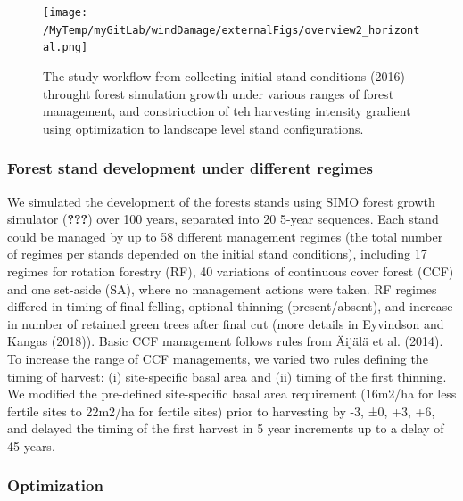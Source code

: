 \documentclass[]{elsarticle} %
\begin{document}
\begin{figure}
\centering
\texttt{[image: /MyTemp/myGitLab/windDamage/externalFigs/overview2\_horizontal.png]}
\caption{The study workflow from collecting initial stand conditions (2016) throught forest simulation growth under various ranges of forest management, and constriuction of teh harvesting intensity gradient using optimization to landscape level stand configurations.\label{workflow}}
\end{figure}

\hypertarget{forest-stand-development-under-different-regimes}{%
\subsubsection{Forest stand development under different regimes}\label{forest-stand-development-under-different-regimes}}

We simulated the development of the forests stands using SIMO forest growth simulator ({\textbf{???}}) over 100 years, separated into 20 5-year sequences. Each stand could be managed by up to 58 different management regimes (the total number of regimes per stands depended on the initial stand conditions), including 17 regimes for rotation forestry (RF), 40 variations of continuous cover forest (CCF) and one set-aside (SA), where no management actions were taken. RF regimes differed in timing of final felling, optional thinning (present/absent), and increase in number of retained green trees after final cut (more details in Eyvindson and Kangas (2018)). Basic CCF management follows rules from Äijälä et al. (2014). To increase the range of CCF managements, we varied two rules defining the timing of harvest: (i) site-specific basal area and (ii) timing of the first thinning. We modified the pre-defined site-specific basal area requirement (16m2/ha for less fertile sites to 22m2/ha for fertile sites) prior to harvesting by -3, ±0, +3, +6, and delayed the timing of the first harvest in 5 year increments up to a delay of 45 years.

\hypertarget{optimization}{%
\subsubsection{Optimization}\label{optimization}}
\end{document}
